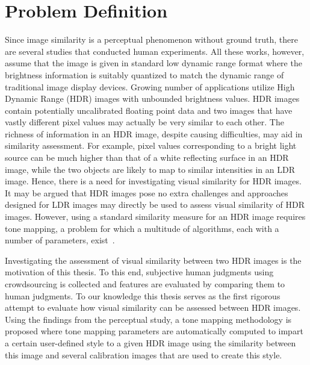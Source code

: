 \section{Problem Definition}
Since image similarity is a perceptual phenomenon without ground truth, there are several studies that conducted human experiments. All these works, however, assume that the image is given in standard low dynamic range format where the brightness information is suitably quantized to match the dynamic range of traditional image display devices. Growing number of applications utilize High Dynamic Range (HDR) images with unbounded brightness values. HDR images contain potentially uncalibrated floating point data and two images that have vastly different pixel values may actually be very similar to each other. The richness of information in an HDR image, despite causing difficulties, may aid in similarity assessment. For example, pixel values corresponding to a bright light source can be much higher than that of a white reflecting surface in an HDR image, while the two objects are likely to map to similar intensities in an LDR image. Hence, there is a need for investigating visual similarity for HDR images. It may be argued that HDR images pose no extra challenges and approaches designed for LDR images may directly be used to assess visual similarity of HDR images. However, using a standard similarity measure for an HDR image requires tone mapping, a problem for which a multitude of algorithms, each with a number of parameters, exist~\cite{yeganeh2012objective}.

Investigating the assessment of visual similarity between two HDR images is the motivation of this thesis. To this end, subjective human judgments using crowdsourcing is collected and features are evaluated by comparing them to human judgments. To our knowledge this thesis serves as the first rigorous attempt to evaluate how visual similarity can be assessed between HDR images. Using the findings from the perceptual study, a tone mapping methodology is proposed where tone mapping parameters are automatically computed to impart a certain user-defined style to a given HDR image using the similarity between this image and several calibration images that are used to create this style.

